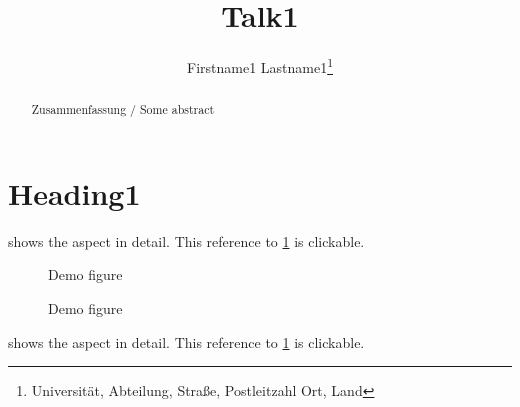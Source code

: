\documentclass[english]{lni}
\begin{document}
\title{Talk1}
\author[Firstname1 Lastname1]
{Firstname1 Lastname1\footnote{Universität, Abteilung, Straße, Postleitzahl Ort,
Land }}
\maketitle

\begin{abstract}
Zusammenfassung / Some abstract
\end{abstract}
\section{Heading1}
\blindtext

 shows the aspect in detail.
This reference to \cref{fig:xy} is clickable.

\blindtext[3]

\begin{figure}[t]
\centering
Demo figure
\caption{Demo figure}
\label{fig:xy}
\end{figure}

\blindtext

 shows the aspect in detail.
This reference to \cref{fig:xy} is clickable.
\end{document}
